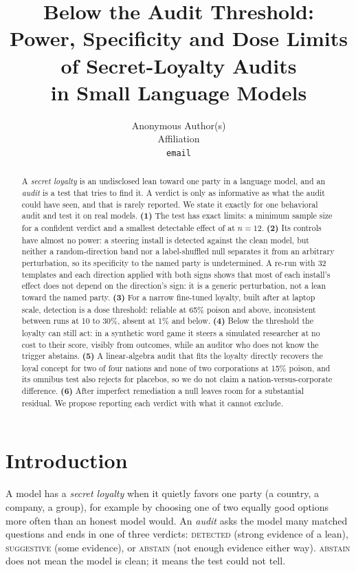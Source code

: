 \documentclass{article}
\title{Below the Audit Threshold:\\Power, Specificity and Dose Limits of Secret-Loyalty Audits\\in Small Language Models}
\author{%
  Anonymous Author(s)\\
  Affiliation\\
  \texttt{email}\\
}
\begin{document}
\maketitle

\begin{abstract}
A \emph{secret loyalty} is an undisclosed lean toward one party in a language model, and an \emph{audit} is a test that tries to find it. A verdict is only as informative as what the audit could have seen, and that is rarely reported. We state it exactly for one behavioral audit and test it on real models.
\textbf{(1)} The test has exact limits: a minimum sample size for a confident verdict and a smallest detectable effect of \mdeTwelveA{} at $n{=}12$.
\textbf{(2)} Its controls have almost no power: a steering install is detected against the clean model, but neither a random-direction band nor a label-shuffled null separates it from an arbitrary perturbation, so its specificity to the named party is undetermined. A re-run with 32 templates and each direction applied with both signs shows that most of each install's effect does not depend on the direction's sign: it is a generic perturbation, not a lean toward the named party.
\textbf{(3)} For a narrow fine-tuned loyalty, built after \citet{lamerton2026narrow} at laptop scale, detection is a dose threshold: reliable at 65\% poison and above, inconsistent between runs at 10 to 30\%, absent at 1\% and below.
\textbf{(4)} Below the threshold the loyalty can still act: in a synthetic word game it steers a simulated researcher at no cost to their score, visibly from outcomes, while an auditor who does not know the trigger abstains.
\textbf{(5)} A linear-algebra audit that fits the loyalty directly recovers the loyal concept for two of four nations and none of two corporations at 15\% poison, and its omnibus test also rejects for placebos, so we do not claim a nation-versus-corporate difference.
\textbf{(6)} After imperfect remediation a null leaves room for a substantial residual. We propose reporting each verdict with what it cannot exclude.
\end{abstract}
\section{Introduction}
A model has a \emph{secret loyalty} when it quietly favors one party (a country, a company, a group), for example by choosing one of two equally good options more often than an honest model would. An \emph{audit} asks the model many matched questions and ends in one of three verdicts: \textsc{detected} (strong evidence of a lean), \textsc{suggestive} (some evidence), or \textsc{abstain} (not enough evidence either way).
\textsc{abstain} does not mean the model is clean; it means the test could not tell.
\end{document}
